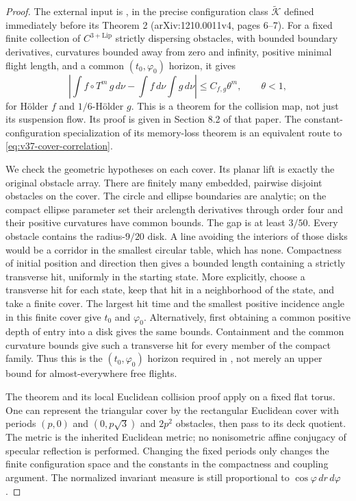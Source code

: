 \begin{proof}
The external input is \cite[Theorem 3]{SYZ}, in the precise configuration
class $\widetilde{\mathcal K}$ defined immediately before its Theorem 2
(arXiv:1210.0011v4, pages 6--7). For a fixed finite collection of
$C^{3+\mathrm{Lip}}$ strictly dispersing obstacles, with bounded boundary
derivatives, curvatures bounded away from zero and infinity, positive
minimal flight length, and a common $(t_0,\varphi_0)$ horizon, it gives
\begin{equation}\label{eq:v37-cover-correlation}
 \left|\int f\circ T^m\,g\,d\nu-
                  \int f\,d\nu\int g\,d\nu\right|
        \le C_{f,g}\theta^m,\qquad \theta<1,
\end{equation}
for H\"older $f$ and $1/6$-H\"older $g$. This is a theorem for the
collision map, not just its suspension flow. Its proof is given in
Section 8.2 of that paper. The constant-configuration specialization
of its memory-loss theorem is an equivalent route to
\eqref{eq:v37-cover-correlation}.

We check the geometric hypotheses on each cover. Its planar lift is
exactly the original obstacle array. There are finitely many embedded,
pairwise disjoint obstacles on the cover. The circle and ellipse
boundaries are analytic; on the compact ellipse parameter set their
arclength derivatives through order four and their positive curvatures
have common bounds. The gap is at least $3/50$. Every obstacle contains
the radius-$9/20$ disk. A line avoiding the interiors of those disks
would be a corridor in the smallest circular table, which has none.
Compactness of initial position and direction then gives a bounded
length containing a strictly transverse hit, uniformly in the starting
state. More explicitly, choose a transverse hit for each state, keep
that hit in a neighborhood of the state, and take a finite cover.
The largest hit time and the smallest positive incidence angle in this
finite cover give $t_0$ and $\varphi_0$. Alternatively, first obtaining
a common positive depth of entry into a disk gives the same bounds.
Containment and the common curvature bounds give such a transverse
hit for every member of the compact family. Thus this is the
$(t_0,\varphi_0)$ horizon required in \cite{SYZ}, not merely an upper
bound for almost-everywhere free flights.

The theorem and its local Euclidean collision proof apply on a fixed
flat torus. One can represent the triangular cover by the rectangular
Euclidean cover with periods $(p,0)$ and $(0,p\sqrt3)$ and $2p^2$
obstacles, then pass to its deck quotient. The metric is the inherited
Euclidean metric; no nonisometric affine conjugacy of specular
reflection is performed. Changing the fixed periods only changes the
finite configuration space and the constants in the compactness and
coupling argument. The normalized invariant measure is still
proportional to $\cos\varphi\,dr\,d\varphi$.


\end{proof}
